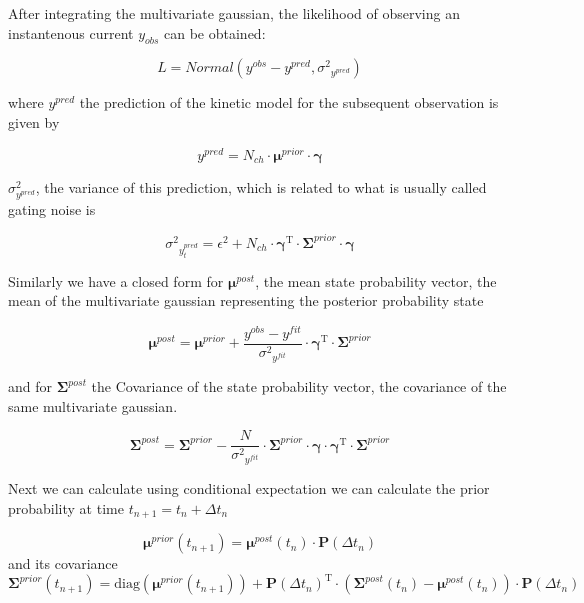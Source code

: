 \documentclass[pdflatex,sn-mathphys-num]{sn-jnl}%
\theoremstyle{thmstyleone}%
\theoremstyle{thmstyletwo}%
\theoremstyle{thmstylethree}%
\begin{document}
After integrating the multivariate gaussian, the likelihood of observing an instantenous current $y_{obs}$ can be obtained:

\begin{equation}
	L= Normal \left (y^{obs}-y^{pred}, {\sigma^2}_{y^{pred}} \right)
\end{equation}

where $y^{pred}$ the prediction of the kinetic model for the subsequent observation is given by

\begin{equation}
	y^{pred} = N_{ch} \cdot \mathbf \mu^{prior} \cdot \mathbf \gamma
\end{equation}

$\sigma^2_{y^{pred}}$, the variance of this prediction, which is related to what is usually called gating noise is 

\begin{equation}
	{\sigma^2}_{y^{pred}_{t}}
	= \epsilon^2 +N_{ch} \cdot {\mathbf \gamma}^{\mathrm{T}} \cdot \mathbf \Sigma^{prior} \cdot \mathbf \gamma
\end{equation}


Similarly we have a closed form for $\mathbf \mu^{post}$, the mean state probability vector, the mean of the multivariate gaussian representing the posterior probability state 

\begin{equation}
	\mathbf \mu^{post}= \mathbf \mu^{prior} + {\frac {y^{obs} - y^{fit}}{{\sigma^2}_{y^{fit}} }}\cdot {\mathbf \gamma}^\mathrm{T} \cdot \mathbf \Sigma^{prior} 
\end{equation}

and for $\mathbf \Sigma^{post}$ the Covariance of the state probability vector, the covariance of the same multivariate gaussian. 
 

\begin{equation}
	\mathbf \Sigma^{post} = \mathbf \Sigma^{prior} - {\frac {N}{{\sigma^2}_{y^{fit}}}}\cdot \mathbf \Sigma^{prior} \cdot \mathbf \gamma \cdot {\mathbf \gamma}^\mathrm{T} \cdot \mathbf \Sigma^{prior}
\end{equation}


Next we can calculate using conditional expectation we can calculate the prior probability at time $t_{n+1}= t_n+\Delta t_n$  


\begin{equation}
	\mathbf \mu^{prior}(t_{n+1}) = \mathbf \mu^{post}(t_n) \cdot \mathbf P(\Delta t_n)
\end{equation}
and its covariance 
\begin{equation}
	\mathbf \Sigma^{prior}(t_{n+1})= \mathrm{diag}(\mathbf \mu^{prior}(t_{n+1}) ) + {\mathbf P(\Delta t_n)}^\mathrm{T} \cdot (\mathbf \Sigma^{post}(t_{n})- \mathbf \mu^{post}(t_{n})) \cdot \mathbf P(\Delta t_n)
\end{equation}
\end{document}

